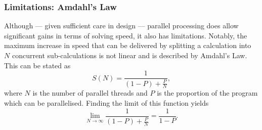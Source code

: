 		\subsubsection{Limitations: Amdahl's Law}
		
			Although --- given sufficient care in design --- parallel processing does allow significant gains in terms of solving speed, it also has limitations. Notably, the maximum increase in speed that can be delivered by splitting a calculation into $N$ concurrent sub-calculations is not linear and is described by Amdahl's Law. This can be stated as
			\[
				S(N) = \frac{1}{(1-P) + \frac{P}{N}},
			\]
			where $N$ is the number of parallel threads and $P$ is the proportion of the program which can be parallelised. Finding the limit of this function yields
			\[
				\lim\limits_{N \to \infty}\frac{1}{(1-P) + \frac{P}{N}} = \frac{1}{1-P}.
			\]
